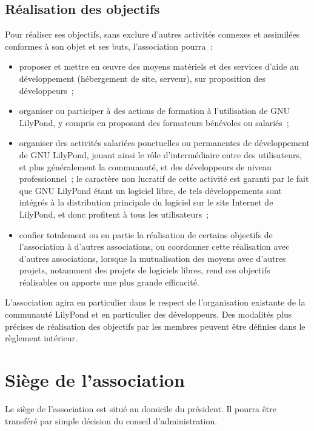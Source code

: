 \documentclass[a4wide,12pt]{scrartcl}
\begin{document}
\subsection{Réalisation des objectifs}

Pour réaliser ses objectifs, sans exclure d'autres activités connexes
et assimilées conformes à son objet et ses buts, l'association pourra~:
\begin{itemize}
\item proposer et mettre en œuvre des moyens matériels et des services
  d'aide au développement (hébergement de site, serveur), sur
  proposition des développeurs~;
\item organiser ou participer à des actions de formation à
  l'utilisation de GNU LilyPond, y compris en proposant des formateurs
  bénévoles ou salariés~;
\item organiser des activités salariées ponctuelles ou permanentes de
  développement de GNU LilyPond, jouant ainsi le rôle d'intermédiaire
  entre des utilisateurs, et plus généralement la communauté, et des
  développeurs de niveau professionnel~; le caractère non lucratif de
  cette activité est garanti par le fait que GNU LilyPond étant un
  logiciel libre, de tels développements sont intégrés à la
  distribution principale du logiciel sur le site Internet de
  LilyPond, et donc profitent à tous les utilisateurs~;
\item confier totalement ou en partie la réalisation de certains
  objectifs de l'association à d'autres associations, ou coordonner
  cette réalisation avec d'autres associations, lorsque la
  mutualisation des moyens avec d'autres projets, notamment des
  projets de logiciels libres, rend ces objectifs réalisables ou
  apporte une plus grande efficacité.
\end{itemize}

L'association agira en particulier dans le respect de l'organisation
existante de la communauté LilyPond et en particulier des
développeurs. Des modalités plus précises de réalisation des objectifs
par les membres peuvent être définies dans le règlement intérieur.

\section{Siège de l'association}

Le siège de l'association est situé au domicile du président. Il
pourra être transféré par simple décision du conseil d'administration.
\end{document}
